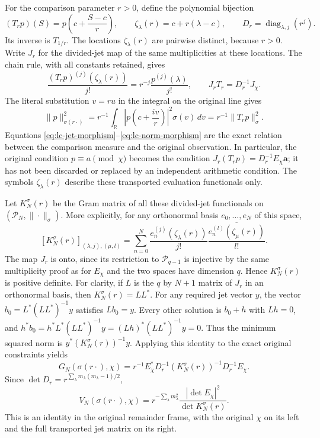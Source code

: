 For the comparison parameter $r>0$, define the polynomial bijection
\[
 (T_rp)(S)=p\left(c+\frac{S-c}{r}\right),
 \qquad
 \zeta_\lambda(r)=c+r(\lambda-c),
 \qquad
 D_r=\operatorname{diag}_{\lambda,j}(r^j).
 \tag{LC.10}\label{eq:lc-pullback}
\]
Its inverse is $T_{1/r}$. The locations $\zeta_\lambda(r)$ are pairwise
distinct, because $r>0$. Write $J_r$ for the divided-jet map of the same
multiplicities at these locations. The chain rule, with all constants
retained, gives
\[
 \frac{(T_rp)^{(j)}(\zeta_\lambda(r))}{j!}
 =r^{-j}\frac{p^{(j)}(\lambda)}{j!},
 \qquad J_rT_r=D_r^{-1}J_\chi.
 \tag{LC.11}\label{eq:lc-jet-morphism}
\]
The literal substitution $v=ru$ in the integral on the original line gives
\[
 \|p\|_{\sigma(r\cdot)}^2
 =r^{-1}\int_{\mathbb R}
 \left|p\left(c+\frac{iv}{r}\right)\right|^2\sigma(v)\,dv
 =r^{-1}\|T_rp\|_\sigma^2.
 \tag{LC.12}\label{eq:lc-norm-morphism}
\]
Equations \eqref{eq:lc-jet-morphism}--\eqref{eq:lc-norm-morphism} are the
exact relation between the comparison measure and the original observation.
In particular, the original condition $p\equiv a\pmod\chi$ becomes the
condition $J_r(T_rp)=D_r^{-1}E_\chi\boldsymbol a$; it has not been discarded
or replaced by an independent arithmetic condition. The symbols
$\zeta_\lambda(r)$ describe these transported evaluation functionals only.

Let $K_N^\sigma(r)$ be the Gram matrix of all these divided-jet functionals
on $(\mathcal P_N,\|\cdot\|_\sigma)$. More explicitly, for any orthonormal
basis $e_0,\ldots,e_N$ of this space,
\[
 [K_N^\sigma(r)]_{(\lambda,j),(\mu,l)}
 =\sum_{n=0}^N
 \frac{e_n^{(j)}(\zeta_\lambda(r))}{j!}
 \overline{\frac{e_n^{(l)}(\zeta_\mu(r))}{l!}}.
 \tag{LC.13}\label{eq:lc-kernel-definition}
\]
The map $J_r$ is onto, since its restriction to $\mathcal P_{q-1}$ is
injective by the same multiplicity proof as for $E_\chi$ and the two spaces
have dimension $q$. Hence $K_N^\sigma(r)$ is positive definite.
For clarity, if $L$ is the $q$ by $N+1$ matrix of $J_r$ in an orthonormal
basis, then $K_N^\sigma(r)=LL^*$. For any required jet vector $y$, the vector
$b_0=L^*(LL^*)^{-1}y$ satisfies $Lb_0=y$. Every other solution is $b_0+h$
with $Lh=0$, and
$h^*b_0=h^*L^*(LL^*)^{-1}y=(Lh)^*(LL^*)^{-1}y=0$.
Thus the minimum squared norm is $y^*(K_N^\sigma(r))^{-1}y$.
Applying this identity to the exact original constraints yields
\[
 \boxed{
 G_N(\sigma(r\cdot),\chi)
 =r^{-1}E_\chi^*D_r^{-1}
 (K_N^\sigma(r))^{-1}D_r^{-1}E_\chi.}
 \tag{LC.14}\label{eq:lc-exact-matrix}
\]
Since $\det D_r=r^{\sum_\lambda m_\lambda(m_\lambda-1)/2}$,
\[
 \boxed{
 V_N(\sigma(r\cdot),\chi)
 =r^{-\sum_\lambda m_\lambda^2}
 \frac{|\det E_\chi|^2}{\det K_N^\sigma(r)}.}
 \tag{LC.15}\label{eq:lc-exact-determinant}
\]
This is an identity in the original remainder frame, with the original
$\chi$ on its left and the full transported jet matrix on its right.

